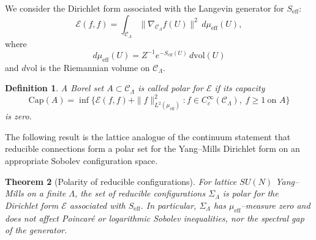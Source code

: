 \documentclass[11pt]{article}
\numberwithin{equation}{section}
\newtheorem{theorem}{Theorem}[section]
\newtheorem{definition}[theorem]{Definition}
\begin{document}
We consider the Dirichlet form associated with the Langevin generator
for $S_{\mathrm{eff}}$:
\[
  \mathcal{E}(f,f)
  = \int_{\mathcal{C}_\Lambda} \|\nabla_{\mathcal{C}_\Lambda} f(U)\|^2\,
    d\mu_{\mathrm{eff}}(U),
\]
where
\[
  d\mu_{\mathrm{eff}}(U) = Z^{-1} e^{-S_{\mathrm{eff}}(U)}\,d\mathrm{vol}(U)
\]
and $d\mathrm{vol}$ is the Riemannian volume on $\mathcal{C}_\Lambda$.

\begin{definition}
A Borel set $A\subset\mathcal{C}_\Lambda$ is called \emph{polar} for
$\mathcal{E}$ if its capacity
\[
  \mathrm{Cap}(A)
  = \inf\Big\{\mathcal{E}(f,f)+\|f\|_{L^2(\mu_{\mathrm{eff}})}^2 :
               f\in C^\infty_c(\mathcal{C}_\Lambda),\; f\ge 1\ \text{on }A\Big\}
\]
is zero.
\end{definition}

The following result is the lattice analogue of the continuum statement
that reducible connections form a polar set for the Yang--Mills
Dirichlet form on an appropriate Sobolev configuration space.

\begin{theorem}[Polarity of reducible configurations]
\label{thm:polarity}
For lattice $SU(N)$ Yang--Mills on a finite $\Lambda$, the set of
reducible configurations $\Sigma_\Lambda$ is polar for the Dirichlet
form $\mathcal{E}$ associated with $S_{\mathrm{eff}}$.  In particular,
$\Sigma_\Lambda$ has $\mu_{\mathrm{eff}}$--measure zero and does not
affect Poincar\'e or logarithmic Sobolev inequalities, nor the spectral
gap of the generator.
\end{theorem}
\end{document}
